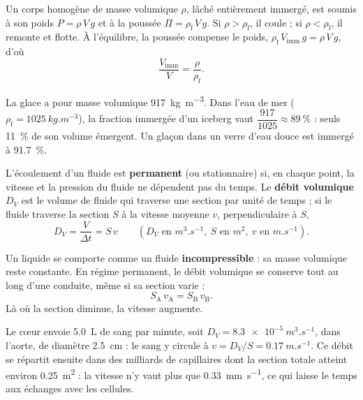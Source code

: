 \begin{propriete}
Un corps homogène de masse volumique $\rho$, lâché entièrement immergé, est soumis à son poids $P=\rho\,V\,g$ et à la
poussée $\Pi=\rho_\mathrm{f}\,V\,g$. Si $\rho>\rho_\mathrm{f}$, il coule ; si $\rho<\rho_\mathrm{f}$, il remonte et flotte.
À l'équilibre, la poussée compense le poids, $\rho_\mathrm{f}\,V_\mathrm{imm}\,g=\rho\,V\,g$, d'où
\[\frac{V_\mathrm{imm}}{V}=\frac{\rho}{\rho_\mathrm{f}}.\]
\end{propriete}
\begin{exemple}
La glace a pour masse volumique \qty{917}{kg.m^{-3}}. Dans l'eau de mer ($\rho_\mathrm{f}=\qty{1025}{kg.m^{-3}}$), la
fraction immergée d'un iceberg vaut $\dfrac{917}{1025}\approx\qty{89}{\percent}$ : seuls 11~\% de son volume émergent.
Un glaçon dans un verre d'eau douce est immergé à \qty{91,7}{\percent}.
\end{exemple}
\begin{definition}
L'écoulement d'un fluide est \textbf{permanent} (ou stationnaire) si, en chaque point, la vitesse et la pression du
fluide ne dépendent pas du temps. Le \textbf{débit volumique} $D_V$ est le volume de fluide qui traverse une section par
unité de temps ; si le fluide traverse la section $S$ à la vitesse moyenne $v$, perpendiculaire à $S$,
\[D_V=\frac{V}{\Delta t}=S\,v\qquad(D_V\text{ en }\unit{m^3.s^{-1}},\ S\text{ en }\unit{m^2},\ v\text{ en }\unit{m.s^{-1}}).\]
\end{definition}
\begin{propriete}
Un liquide se comporte comme un fluide \textbf{incompressible} : sa masse volumique reste constante. En régime permanent,
le débit volumique se conserve tout au long d'une conduite, même si sa section varie :
\[S_\mathrm{A}\,v_\mathrm{A}=S_\mathrm{B}\,v_\mathrm{B}.\]
Là où la section diminue, la vitesse augmente.
\end{propriete}
\begin{exemple}
Le cœur envoie \qty{5,0}{L} de sang par minute, soit $D_V=\qty{8,3e-5}{m^3.s^{-1}}$, dans l'aorte, de diamètre
\qty{2,5}{cm} : le sang y circule à $v=D_V/S=\qty{0,17}{m.s^{-1}}$. Ce débit se répartit ensuite dans des milliards de
capillaires dont la section totale atteint environ \qty{0,25}{m^2} : la vitesse n'y vaut plus que \qty{0,33}{mm.s^{-1}},
ce qui laisse le temps aux échanges avec les cellules.
\end{exemple}
